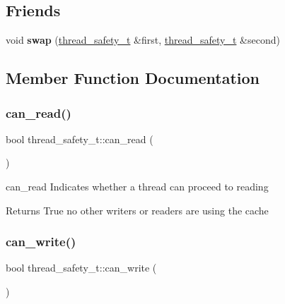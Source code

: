 \subsection*{Friends}
\begin{DoxyCompactItemize}
\item 
\mbox{\label{structthread__safety__t_ae492c1db158c3c7e1fbf4281dda04912}} 
void {\bfseries swap} (\mbox{\hyperlink{structthread__safety__t}{thread\+\_\+safety\+\_\+t}} \&first, \mbox{\hyperlink{structthread__safety__t}{thread\+\_\+safety\+\_\+t}} \&second)
\end{DoxyCompactItemize}


\subsection{Member Function Documentation}
\mbox{\label{structthread__safety__t_abf2d3b518c725fb1997f7d05ab37c6fb}} 
\subsubsection{\texorpdfstring{can\_read()}{can\_read()}}
{\footnotesize\ttfamily bool thread\+\_\+safety\+\_\+t\+::can\+\_\+read (\begin{DoxyParamCaption}{ }\end{DoxyParamCaption})\hspace{0.3cm}{\ttfamily [inline]}}



can\+\_\+read Indicates whether a thread can proceed to reading 

\begin{DoxyReturn}{Returns}
True no other writers or readers are using the cache 
\end{DoxyReturn}
\mbox{\label{structthread__safety__t_ae6e20ce43a82ebd21e326bfe2d18f8bf}} 
\subsubsection{\texorpdfstring{can\_write()}{can\_write()}}
{\footnotesize\ttfamily bool thread\+\_\+safety\+\_\+t\+::can\+\_\+write (\begin{DoxyParamCaption}{ }\end{DoxyParamCaption})\hspace{0.3cm}{\ttfamily [inline]}}



